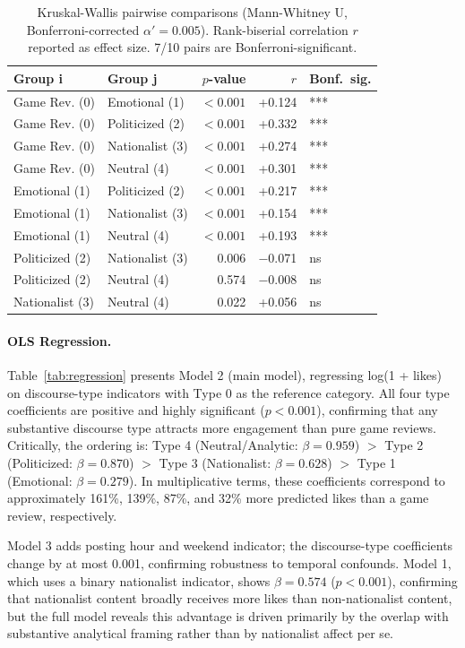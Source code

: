 \documentclass[letterpaper]{article}
\begin{document}
\begin{table}[t]
\centering
\caption{Kruskal-Wallis pairwise comparisons (Mann-Whitney U, Bonferroni-corrected $\alpha' = 0.005$). Rank-biserial correlation $r$ reported as effect size. 7/10 pairs are Bonferroni-significant.}
\label{tab:kruskal}
\begin{tabular}{llrrl}
\toprule
Group i & Group j & $p$-value & $r$ & Bonf.\ sig. \\
\midrule
Game Rev. (0) & Emotional (1) & $< 0.001$ & +0.124 & *** \\
Game Rev. (0) & Politicized (2) & $< 0.001$ & +0.332 & *** \\
Game Rev. (0) & Nationalist (3) & $< 0.001$ & +0.274 & *** \\
Game Rev. (0) & Neutral (4) & $< 0.001$ & +0.301 & *** \\
Emotional (1) & Politicized (2) & $< 0.001$ & +0.217 & *** \\
Emotional (1) & Nationalist (3) & $< 0.001$ & +0.154 & *** \\
Emotional (1) & Neutral (4) & $< 0.001$ & +0.193 & *** \\
Politicized (2) & Nationalist (3) & 0.006 & $-$0.071 & ns \\
Politicized (2) & Neutral (4) & 0.574 & $-$0.008 & ns \\
Nationalist (3) & Neutral (4) & 0.022 & +0.056 & ns \\
\bottomrule
\end{tabular}
\end{table}

\paragraph{OLS Regression.}
Table~\ref{tab:regression} presents Model 2 (main model), regressing log(1 + likes) on discourse-type indicators with Type 0 as the reference category. All four type coefficients are positive and highly significant ($p < 0.001$), confirming that any substantive discourse type attracts more engagement than pure game reviews. Critically, the ordering is: Type 4 (Neutral/Analytic: $\beta = 0.959$) $>$ Type 2 (Politicized: $\beta = 0.870$) $>$ Type 3 (Nationalist: $\beta = 0.628$) $>$ Type 1 (Emotional: $\beta = 0.279$). In multiplicative terms, these coefficients correspond to approximately 161\%, 139\%, 87\%, and 32\% more predicted likes than a game review, respectively.

Model 3 adds posting hour and weekend indicator; the discourse-type coefficients change by at most 0.001, confirming robustness to temporal confounds. Model 1, which uses a binary nationalist indicator, shows $\beta = 0.574$ ($p < 0.001$), confirming that nationalist content broadly receives more likes than non-nationalist content, but the full model reveals this advantage is driven primarily by the overlap with substantive analytical framing rather than by nationalist affect per se.
\end{document}
